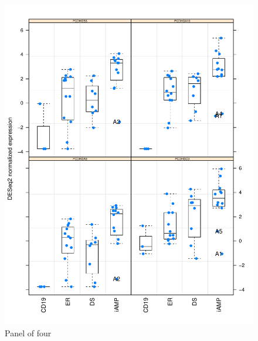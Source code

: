\clearpage
\begin{figure}[!ht]
\begin{center}
\includegraphics{geneboxplot-component-figure1.pdf}
\end{center}
\caption{Panel of four}
\end{figure}
